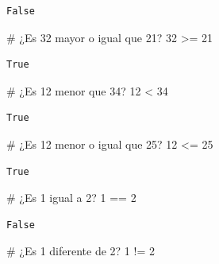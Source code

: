 \documentclass[
  spanish,
  letterpaper,
]{scrbook}
\newenvironment{Shaded}{\begin{snugshade}}{\end{snugshade}}
\newcommand{\CommentTok}[1]{\textcolor[rgb]{0.37,0.37,0.37}{#1}}
\newcommand{\DecValTok}[1]{\textcolor[rgb]{0.68,0.00,0.00}{#1}}
\newcommand{\OperatorTok}[1]{\textcolor[rgb]{0.37,0.37,0.37}{#1}}
\theoremstyle{definition}
\theoremstyle{remark}
\begin{document}
\begin{verbatim}
False
\end{verbatim}

\begin{Shaded}
\begin{Highlighting}[]
\CommentTok{\# ¿Es 32 mayor o igual que 21?}
\DecValTok{32} \OperatorTok{\textgreater{}=} \DecValTok{21} 
\end{Highlighting}
\end{Shaded}

\begin{verbatim}
True
\end{verbatim}

\begin{Shaded}
\begin{Highlighting}[]
\CommentTok{\# ¿Es 12 menor que 34?}
\DecValTok{12} \OperatorTok{\textless{}} \DecValTok{34} 
\end{Highlighting}
\end{Shaded}

\begin{verbatim}
True
\end{verbatim}

\begin{Shaded}
\begin{Highlighting}[]
\CommentTok{\# ¿Es 12 menor o igual que 25?}
\DecValTok{12} \OperatorTok{\textless{}=} \DecValTok{25} 
\end{Highlighting}
\end{Shaded}

\begin{verbatim}
True
\end{verbatim}

\begin{Shaded}
\begin{Highlighting}[]
\CommentTok{\# ¿Es 1 igual a 2?}
\DecValTok{1} \OperatorTok{==} \DecValTok{2} 
\end{Highlighting}
\end{Shaded}

\begin{verbatim}
False
\end{verbatim}

\begin{Shaded}
\begin{Highlighting}[]
\CommentTok{\# ¿Es 1 diferente de 2?}
\DecValTok{1} \OperatorTok{!=} \DecValTok{2}
\end{Highlighting}
\end{Shaded}
\end{document}

